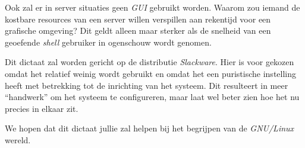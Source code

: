 \documentclass[a4paper,11pt]{report}
\begin{document}
Ook zal er in server situaties geen \emph{GUI} gebruikt worden. Waarom zou iemand de kostbare resources van een server willen verspillen aan rekentijd voor een grafische omgeving? Dit geldt alleen maar sterker als de snelheid van een geoefende \emph{shell} gebruiker in ogenschouw wordt genomen. 

Dit dictaat zal worden gericht op de distributie \emph{Slackware}. Hier is voor gekozen omdat het relatief weinig wordt gebruikt en omdat het een puristische instelling heeft met betrekking tot de inrichting van het systeem. Dit resulteert in meer ``handwerk'' om het systeem te configureren, maar laat wel beter zien hoe het nu precies in elkaar zit. 

We hopen dat dit dictaat jullie zal helpen bij het begrijpen van de \emph{GNU/Linux} wereld.

\setcounter{page}{13}














\appendix












{}



{}
\printindex

\end{document}
